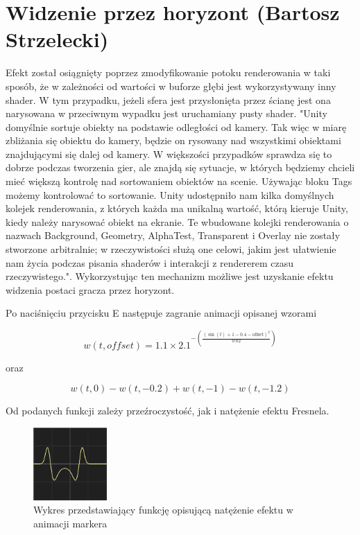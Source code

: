 \section{Widzenie przez horyzont (Bartosz Strzelecki)}
Efekt został osiągnięty poprzez zmodyfikowanie potoku renderowania w taki sposób, że w zależności od wartości w buforze głębi jest wykorzystywany inny shader.
W tym przypadku, jeżeli sfera jest przysłonięta przez ścianę jest ona narysowana w przeciwnym wypadku jest uruchamiany pusty shader.
"Unity domyślnie sortuje obiekty na podstawie odległości od kamery. Tak więc
w miarę zbliżania się obiektu do kamery, będzie on rysowany nad wszystkimi obiektami znajdującymi się dalej od kamery.
W większości przypadków sprawdza się to dobrze podczas tworzenia gier, ale
znajdą się sytuacje, w których będziemy chcieli mieć większą kontrolę nad sortowaniem obiektów na scenie. Używając bloku Tags{} możemy kontrolować to sortowanie.
Unity udostępniło nam kilka domyślnych kolejek renderowania, z których każda ma unikalną wartość, którą
kieruje Unity, kiedy należy narysować obiekt na ekranie. Te wbudowane kolejki renderowania
o nazwach Background, Geometry, AlphaTest, Transparent i Overlay nie zostały stworzone arbitralnie; w rzeczywistości służą one celowi, jakim jest ułatwienie nam życia podczas
pisania shaderów i interakcji z rendererem czasu rzeczywistego."\cite{shaderscookbook}. Wykorzystując ten mechanizm
możliwe jest uzyskanie efektu widzenia postaci gracza przez horyzont.

Po naciśnięciu przycisku E następuje zagranie animacji opisanej wzorami 

\begin{equation}
w(t, offset) = 1.1 \times 2.1^{-\left(\frac{{\left(\sin(t) + 1 - 0.4 - \text{{offset}}\right)^2}}{{0.02}}\right)}
\end{equation}

oraz

\begin{equation}
w(t, 0) - w(t, -0.2) + w(t, -1) - w(t, -1.2)
\end{equation}

Od podanych funkcji zależy przeźroczystość, jak i natężenie efektu Fresnela. 

\begin{figure}[h]
    \centering
    \includegraphics[width=0.25\textwidth]{images/g}
    \caption{Wykres przedstawiający funkcję opisującą natężenie efektu w animacji markera}
\end{figure}



